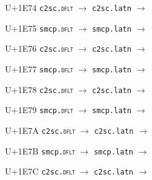 \documentclass{article}
\begin{document}
\begin{substitutions}
\goodbreak

U+1E74  \linebreak
    \texttt{c2sc.\textsc{dflt}} $\to$  \linebreak
    \texttt{c2sc.latn} $\to$  

\goodbreak

U+1E75  \linebreak
    \texttt{smcp.\textsc{dflt}} $\to$  \linebreak
    \texttt{smcp.latn} $\to$  

\goodbreak

U+1E76  \linebreak
    \texttt{c2sc.\textsc{dflt}} $\to$  \linebreak
    \texttt{c2sc.latn} $\to$  

\goodbreak

U+1E77  \linebreak
    \texttt{smcp.\textsc{dflt}} $\to$  \linebreak
    \texttt{smcp.latn} $\to$  

\goodbreak

U+1E78  \linebreak
    \texttt{c2sc.\textsc{dflt}} $\to$  \linebreak
    \texttt{c2sc.latn} $\to$  

\goodbreak

U+1E79  \linebreak
    \texttt{smcp.\textsc{dflt}} $\to$  \linebreak
    \texttt{smcp.latn} $\to$  

\goodbreak

U+1E7A  \linebreak
    \texttt{c2sc.\textsc{dflt}} $\to$  \linebreak
    \texttt{c2sc.latn} $\to$  

\goodbreak

U+1E7B  \linebreak
    \texttt{smcp.\textsc{dflt}} $\to$  \linebreak
    \texttt{smcp.latn} $\to$  

\goodbreak

U+1E7C  \linebreak
    \texttt{c2sc.\textsc{dflt}} $\to$  \linebreak
    \texttt{c2sc.latn} $\to$  


\end{substitutions}
\end{document}
